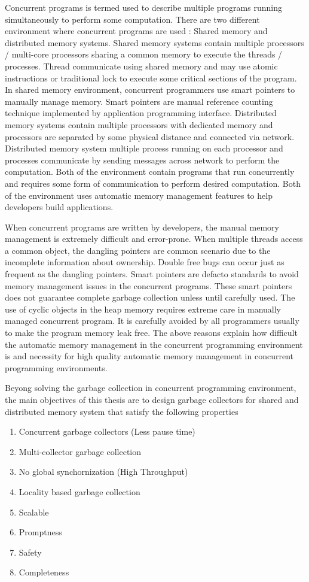 Concurrent programs is termed used to describe multiple programs running simultaneously to perform some computation. There are two different environment where concurrent programs are used : Shared memory and distributed memory systems. Shared memory systems contain multiple processors / multi-core processors sharing a common memory to execute the threads / processes. Thread communicate using shared memory and may use atomic instructions or traditional lock to execute some critical sections of the program. 
In shared memory environment, concurrent programmers use smart pointers to manually manage memory. Smart pointers are manual reference counting technique implemented by application programming interface. Distributed memory systems contain multiple processors with dedicated memory and processors are separated by some physical distance and connected via network. Distributed memory system multiple process running on each processor and processes communicate by sending messages across network to perform the computation. Both of the environment contain programs that run concurrently and requires some form of communication to perform desired computation. Both of the environment uses automatic memory management features to help developers build applications. 

When concurrent programs are written by developers, the manual memory management is extremely difficult and error-prone. When multiple threads access a common object, the dangling pointers are common scenario due to the incomplete information about ownership. Double free bugs can occur just as frequent as the dangling pointers. Smart pointers are defacto standards to avoid memory management issues in the concurrent programs. These smart pointers does not guarantee complete garbage collection unless until carefully used. The use of cyclic objects in the heap memory requires extreme care in manually managed concurrent program. It is carefully avoided by all programmers usually to make the program memory leak free. The above reasons explain how difficult the automatic memory management in the concurrent programming environment is and necessity for high quality automatic memory management in concurrent programming environments. 

Beyong solving the garbage collection in concurrent programming environment, the main objectives of this thesis are to design garbage collectors for shared and distributed memory system that satisfy the following properties
\begin{enumerate}
	\item Concurrent garbage collectors (Less pause time)
	\item Multi-collector garbage collection
	\item No global synchornization (High Throughput)
	\item Locality based garbage collection
	\item Scalable
	\item Promptness
	\item Safety
	\item Completeness
\end{enumerate}

